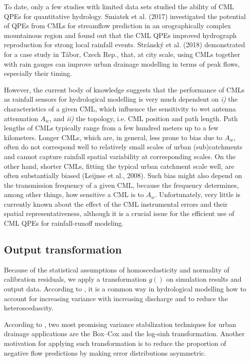 \documentclass{ctuthesis}\usepackage[]{graphicx}\usepackage[]{color}
\begin{document}
To date, only a few studies with limited data sets studied the ability of CML QPEs for quantitative hydrology. Smiatek et al. (2017) investigated the potential of QPEs from CMLs for streamflow prediction in an orographically complex mountainous region and found out that the CML QPEs improved hydrograph reproduction for strong local rainfall events. Stránský et al. (2018) demonstrated for a case study in Tábor, Czech Rep., that, at city scale, using CMLs together with rain gauges can improve urban drainage modelling in terms of peak flows, especially their timing.

However, the current body of knowledge suggests that the performance of CMLs as rainfall sensors for hydrological modelling is very much dependent on \emph{i)} the characteristics of a given CML, which influence the sensitivity to wet antenna attenuation $A_w$, and \emph{ii)} the topology, i.e. CML position and path length. Path lengths of CMLs typically range from a few hundred meters up to a few kilometers. Longer CMLs, which are, in general, less prone to bias due to $A_w$, often do not correspond well to relatively small scales of urban (sub)catchments and cannot capture rainfall spatial variability at corresponding scales. On the other hand, shorter CMLs, fitting the typical urban catchment scale well, are often substantially biased (Leijnse et al., 2008). Such bias might also depend on the transmission frequency of a given CML, because the frequency determines, among other things, how sensitive a CML is to $A_w$. Unfortunately, very little is currently known about the effect of the CML instrumental errors and their spatial representativeness, although it is a crucial issue for the efficient use of CML QPEs for rainfall-runoff modeling.





\subsection{Output transformation} \label{transf}

Because of the  statistical assumptions of homoscedasticity and normality of calibration residuals, we apply a transformation $g()$ on simulation results and output data.  According to  \cite{giudice2013improving}, it is a common way in hydrological modelling how to account for increasing variance with increasing discharge and to reduce the heteroscedascity.

According to \cite{giudice2013improving},  two most promising variance stabilization techniques for urban drainage
applications are the Box–Cox \citep{box1964analysis}  and the log-sinh \citep{wang2012log} transformation. Another motivation for applying such transformation is to reduce the proportion of negative flow predictions by making error distributions asymmetric.
\end{document}

